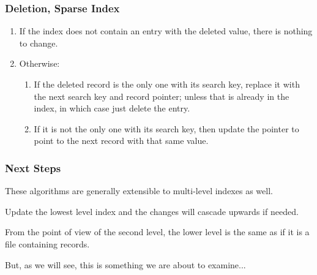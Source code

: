 \begin{frame}
\frametitle{Deletion, Sparse Index}

\begin{enumerate}
	\item If the index does not contain an entry with the deleted value, there is nothing to change.
	\item Otherwise:
		\begin{enumerate}
			\item If the deleted record is the only one with its search key, replace it with the next search key and record pointer; unless that is already in the index, in which case just delete the entry.
			\item If it is not the only one with its search key, then update the pointer to point to the next record with that same value.
		\end{enumerate}
\end{enumerate}


\end{frame}

\begin{frame}
\frametitle{Next Steps}

These algorithms are generally extensible to multi-level indexes as well. 

Update the lowest level index and the changes will cascade upwards if needed. 

From the point of view of the second level, the lower level is the same as if it is a file containing records. 

But, as we will see, this is something we are about to examine...


\end{frame}




